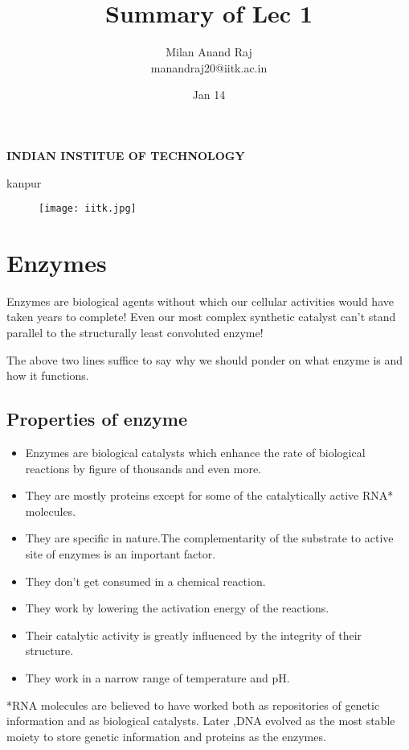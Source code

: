 \documentclass[12pt]{article}
\title{Summary of Lec 1}
\author{Milan Anand Raj\\manandraj20@iitk.ac.in}
\date{Jan 14}
\begin{document}
\NoBgThispage
\maketitle
\begin{center}
\textbf{INDIAN INSTITUE OF TECHNOLOGY}

kanpur
\end{center}


\vfill
\begin{figure}
\centering
\texttt{[image: iitk.jpg]}
\end{figure}
\newpage
\tableofcontents
\clearpage

\section{Enzymes}
Enzymes are biological agents without which our cellular activities would have taken years to complete! Even our most complex synthetic catalyst can't stand parallel to the structurally least convoluted enzyme!

The above two lines suffice to say why we should ponder on what enzyme is and how it functions.
\subsection{Properties of enzyme}
\begin{itemize}
\item Enzymes are biological catalysts which enhance the rate of biological reactions by figure of thousands and even more.
\item They are mostly proteins except for some of the catalytically active RNA{*} molecules. 
\item They are specific in nature.The complementarity of the substrate to active site of enzymes is an important factor.
\item They don't get consumed in a chemical reaction.
\item They work by lowering the activation energy of the reactions.
\item Their catalytic activity is greatly influenced by the integrity of their structure.
\item They work in a narrow range of temperature and pH.

\end{itemize}
\vfill
*RNA molecules are believed to have worked both as repositories of genetic information and as biological catalysts. Later ,DNA evolved as the most stable moiety to store genetic information and proteins as the enzymes.
\clearpage
\end{document}

